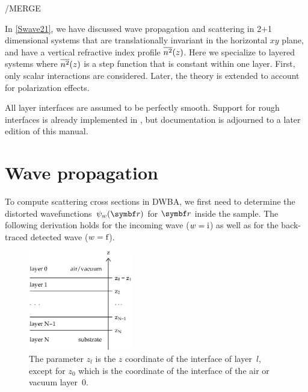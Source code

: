 /MERGE

In \cref{Swave21},
we have discussed wave propagation and scattering in 2$+$1 dimensional systems
that are translationally invariant in the horizontal $xy$ plane,
and have a vertical refractive index profile $\overline{n^2}(z)$.
Here we specialize to layered systems
where $\overline{n^2}(z)$ is a step function that is constant within one layer.
First, only scalar interactions are considered.
Later, the theory is extended to account for polarization effects.


All layer interfaces are assumed to be perfectly smooth.
Support for rough interfaces is already implemented in \BornAgain,
but documentation is adjourned to a later edition of this manual.

\section{Wave propagation}\label{Slayerprop}

To compute scattering cross sections in DWBA,
we first need to determine the distorted wavefunctions~$\psi_w(\r)$
for $\r$ inside the sample.
The following derivation holds for the incoming wave ($w=\text{i}$)
as well as for the back-traced detected wave ($w=\text{f}$).

\begin{figure}[tb]
\begin{center}
\includegraphics[width=0.4\textwidth]{fig/drawing/multilayer_z_conventions.ps}
\end{center}
\caption{The parameter $z_l$ is the $z$ coordinate of the  interface
%
%
%
%
of layer~$l$, except for $z_0$ which is the coordinate of the  interface
of the air or vacuum layer~0.}
\label{Fdefz}
\end{figure}

